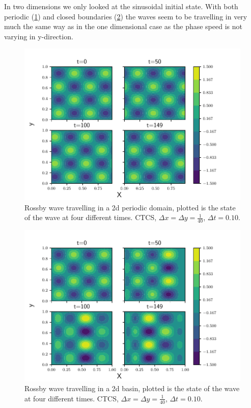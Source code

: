 In two dimensions we only looked at the sinusoidal initial state. With both
periodic (\cref{fig:2d_periodic}) and closed boundaries (\cref{fig:2d_bounded})
the waves seem to be travelling in very much the same way as in the one
dimensional case as the phase speed is not varying in y-direction.

\begin{figure}[H]
  \centering
  \includegraphics[width=\textwidth]{../figures/periodic_2d.pdf}
  \caption{Rossby wave travelling in a 2d periodic domain, plotted is the state of the wave at four different times. CTCS, $\Delta x = \Delta y = \frac{1}{40}$, $\Delta t = 0.10$.}
  \label{fig:2d_periodic}
\end{figure}



\begin{figure}[H]
  \centering
  \includegraphics[width=\textwidth]{../figures/bounded_2d.pdf}
  \caption{Rossby wave travelling in a 2d basin, plotted is the state of the wave  at four different times. CTCS, $\Delta x = \Delta y = \frac{1}{40}$, $\Delta t = 0.10$.}
  \label{fig:2d_bounded}
\end{figure}

